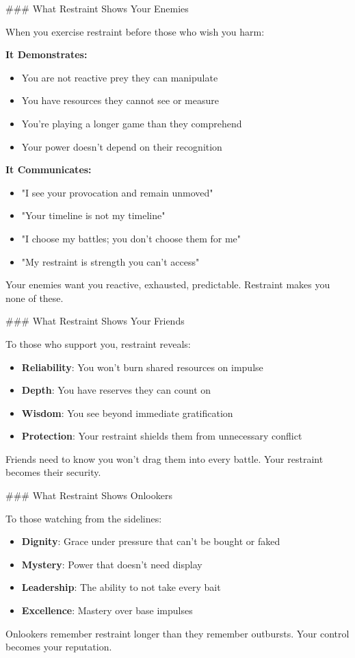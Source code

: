 \documentclass[12pt]{book}
\begin{document}
\#\#\# What Restraint Shows Your Enemies

When you exercise restraint before those who wish you harm:

\textbf{It Demonstrates:}
\begin{itemize}
\item You are not reactive prey they can manipulate
\item You have resources they cannot see or measure
\item You're playing a longer game than they comprehend
\item Your power doesn't depend on their recognition

\end{itemize}
\textbf{It Communicates:}
\begin{itemize}
\item "I see your provocation and remain unmoved"
\item "Your timeline is not my timeline"
\item "I choose my battles; you don't choose them for me"
\item "My restraint is strength you can't access"

\end{itemize}
Your enemies want you reactive, exhausted, predictable. Restraint makes you none of these.

\#\#\# What Restraint Shows Your Friends

To those who support you, restraint reveals:

\begin{itemize}
\item \textbf{Reliability}: You won't burn shared resources on impulse
\item \textbf{Depth}: You have reserves they can count on
\item \textbf{Wisdom}: You see beyond immediate gratification
\item \textbf{Protection}: Your restraint shields them from unnecessary conflict

\end{itemize}
Friends need to know you won't drag them into every battle. Your restraint becomes their security.

\#\#\# What Restraint Shows Onlookers

To those watching from the sidelines:

\begin{itemize}
\item \textbf{Dignity}: Grace under pressure that can't be bought or faked
\item \textbf{Mystery}: Power that doesn't need display
\item \textbf{Leadership}: The ability to not take every bait
\item \textbf{Excellence}: Mastery over base impulses

\end{itemize}
Onlookers remember restraint longer than they remember outbursts. Your control becomes your reputation.
\end{document}
